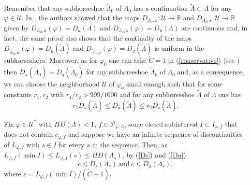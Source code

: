\documentclass[12pt]{amsart}
\theoremstyle{plain} %
\theoremstyle{definition} %
\numberwithin{equation}{section}
\begin{document}
Remember that any subhorseshoe $\tilde{\Lambda}_0$ of $\Lambda_0$ has a continuation $\tilde{\Lambda}\subset\Lambda$ for any $\varphi\in\mathcal{U}$. In \cite[Theorem $A$]{PV}, the authors showed that the maps $D_{\Lambda_0,u}:\mathcal{U}\rightarrow \mathbb{R}$ and $D_{\Lambda_0,s}:\mathcal{U}\rightarrow \mathbb{R}$ given by $D_{\Lambda_0,u}(\varphi)=D_u(\Lambda)$ and $D_{\Lambda_0,s}(\varphi)=D_u(\Lambda)$ are continuous and, in fact, the same proof also shows that the continuity of the maps $D_{\tilde{\Lambda}_0,u}(\varphi)=D_u(\tilde{\Lambda})$ and $D_{\tilde{\Lambda}_0,s}(\varphi)=D_u(\tilde{\Lambda})$ is uniform in the subhorseshoes. Moreover, as for $\varphi_0$ one can take $\tilde{C}=1$ in (\ref{conservative}) (see \cite[Remark 2.2]{CMM16}) then $D_u(\tilde{\Lambda}_0)=D_s(\tilde{\Lambda}_0)$ for any subhorseshoe $\tilde{\Lambda}_0$ of $\Lambda_0$ and, as a consequence, we can choose the neighborhood $ \mathcal{U}$  of $\varphi_0$ small enough such that for some constants $r_1,r_2$ with $r_1/r_2>999/1000$ and for any subhorseshoe $\tilde{\Lambda}$ of $\Lambda$ one has
\begin{equation}\label{c_1c_2}
  r_1D_s(\tilde{\Lambda})\leq D_u(\tilde{\Lambda})\leq r_2D_s(\tilde{\Lambda}).  
\end{equation}

 
Fix $\varphi \in \mathcal{U}^*$ with $HD(\Lambda)<1$, $f\in \mathcal{P}_{\varphi,\Lambda}$, some closed subinterval $I\subset I_{\varphi,f}$ that does not contain $c_{\varphi,f}$ and suppose we have an infinite sequence of discontinuities of $L_{\varphi, f}$ with $s\in I$ for every $s$ in the sequence. Then, as
$L_{\varphi,f}(\min I)\leq L_{\varphi, f}(s)\leq HD(\Lambda_{s})$, by (\ref{Ds}) and (\ref{Du})
\begin{equation}
    c\leq D_s(\Lambda_{s})\ \mbox{and}\ c\leq D_u(\Lambda_{s}),
\end{equation}
where $c=L_{\varphi,f}(\min I)/(\tilde{C}+1).$
\end{document}
